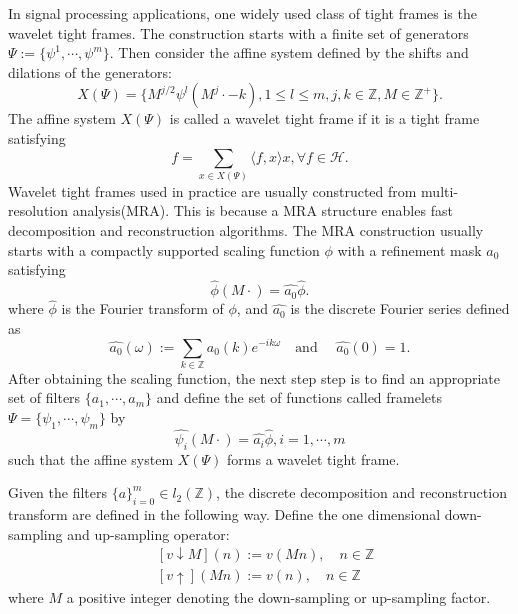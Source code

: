 \documentclass[a4paper]{article}
\begin{document}
In signal processing applications, one widely used class of tight frames is the wavelet tight frames. The construction starts with a finite set of generators $\Psi:=\{\psi^1,\cdots,\psi^m\}$. Then consider the affine system defined by the shifts and dilations of the generators:
\[
X(\Psi)=\{M^{j/2}\psi^{l}(M^j\cdot -k),1\leq l\leq m, j,k\in\mathbb{Z}, M\in\mathbb{Z^+}\}.
\]
The affine system $X(\Psi)$ is called a wavelet tight frame if it is a tight frame satisfying
\[
f=\sum_{x\in X(\Psi)} \langle f,x\rangle x, \forall f \in \mathcal{H}.
\]
Wavelet tight frames used in practice are usually constructed from multi-resolution analysis(MRA). This is because a MRA structure enables fast decomposition and reconstruction algorithms.  The MRA construction usually starts with a compactly supported scaling function $\phi$ with a refinement mask  $a_0$ satisfying
\[
\hat{\phi}(M\cdot)=\hat{a_0}\hat{\phi}.
\]
where $\hat{\phi}$ is the Fourier transform of $\phi$, and $\hat{a_0}$ is the discrete Fourier series defined as
\begin{equation}
 \hat{a_0}(\omega):=\sum_{k\in\mathbb{Z}} a_0(k) e^{-ik\omega} \quad \textrm{and }\quad \hat{a_0}(0)=1.
\end{equation}
 After obtaining the scaling function, the next step step is to find an appropriate set of filters $\{a_1,\cdots,a_m\}$ and define the set of functions called framelets $\Psi=\{\psi_1,\cdots,\psi_m\}$ by
\[
\hat{\psi_i}(M\cdot) = \hat{a_i}\hat{\phi},i=1,\cdots,m
\]
such that the affine system $X(\Psi)$ forms a wavelet tight frame. 

Given the filters $\{a\}_{i=0}^m \in l_2(\mathbb{Z})$, the discrete decomposition and reconstruction transform are defined in the following way. Define the one dimensional down-sampling and up-sampling operator:
\[
\begin{aligned}
	&[v\downarrow M](n):=v(Mn),\quad n\in \mathbb{Z}\\
	&[v\uparrow](Mn):=v(n), \quad n\in \mathbb{Z}
\end{aligned}
\]
where $M$ a positive integer denoting the down-sampling or up-sampling factor.
\end{document}
